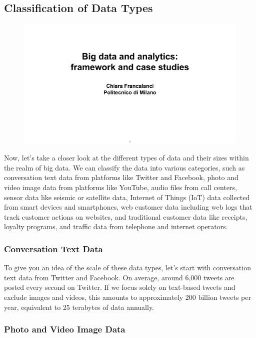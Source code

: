 \subsection{Classification of Data Types}

\begin{figure}[!h]
  \centering
  \includegraphics[page=30, trim = 1.5cm 1.7cm 2cm 4.5cm, clip, width=\imagewidth]{images/06 - BIG_DATA.pdf}
\end{figure}

Now, let's take a closer look at the different types of data and their
sizes within the realm of big data. We can classify the data into
various categories, such as conversation text data from platforms like
Twitter and Facebook, photo and video image data from platforms like
YouTube, audio files from call centers, sensor data like seismic or
satellite data, Internet of Things (IoT) data collected from smart
devices and smartphones, web customer data including web logs that track
customer actions on websites, and traditional customer data like
receipts, loyalty programs, and traffic data from telephone and internet
operators.

\subsubsection{Conversation Text Data}

To give you an idea of the scale of these data types, let's start with
conversation text data from Twitter and Facebook. On average, around
6,000 tweets are posted every second on Twitter. If we focus solely on
text-based tweets and exclude images and videos, this amounts to
approximately 200 billion tweets per year, equivalent to 25 terabytes of
data annually.

\subsubsection{Photo and Video Image Data}

